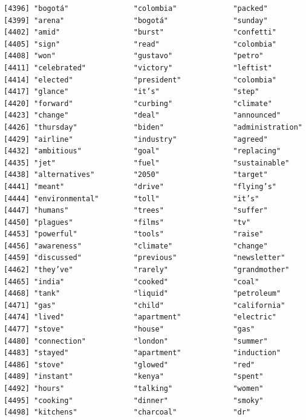 \documentclass[
  letterpaper,
  DIV=11,
  numbers=noendperiod]{scrartcl}
\begin{document}
\begin{verbatim}
[4396] "bogotá"               "colombia"             "packed"              
[4399] "arena"                "bogotá"               "sunday"              
[4402] "amid"                 "burst"                "confetti"            
[4405] "sign"                 "read"                 "colombia"            
[4408] "won"                  "gustavo"              "petro"               
[4411] "celebrated"           "victory"              "leftist"             
[4414] "elected"              "president"            "colombia"            
[4417] "glance"               "it’s"                 "step"                
[4420] "forward"              "curbing"              "climate"             
[4423] "change"               "deal"                 "announced"           
[4426] "thursday"             "biden"                "administration"      
[4429] "airline"              "industry"             "agreed"              
[4432] "ambitious"            "goal"                 "replacing"           
[4435] "jet"                  "fuel"                 "sustainable"         
[4438] "alternatives"         "2050"                 "target"              
[4441] "meant"                "drive"                "flying’s"            
[4444] "environmental"        "toll"                 "it’s"                
[4447] "humans"               "trees"                "suffer"              
[4450] "plagues"              "films"                "tv"                  
[4453] "powerful"             "tools"                "raise"               
[4456] "awareness"            "climate"              "change"              
[4459] "discussed"            "previous"             "newsletter"          
[4462] "they’ve"              "rarely"               "grandmother"         
[4465] "india"                "cooked"               "coal"                
[4468] "tank"                 "liquid"               "petroleum"           
[4471] "gas"                  "child"                "california"          
[4474] "lived"                "apartment"            "electric"            
[4477] "stove"                "house"                "gas"                 
[4480] "connection"           "london"               "summer"              
[4483] "stayed"               "apartment"            "induction"           
[4486] "stove"                "glowed"               "red"                 
[4489] "instant"              "kenya"                "spent"               
[4492] "hours"                "talking"              "women"               
[4495] "cooking"              "dinner"               "smoky"               
[4498] "kitchens"             "charcoal"             "dr"                  

\end{verbatim}
\end{document}
